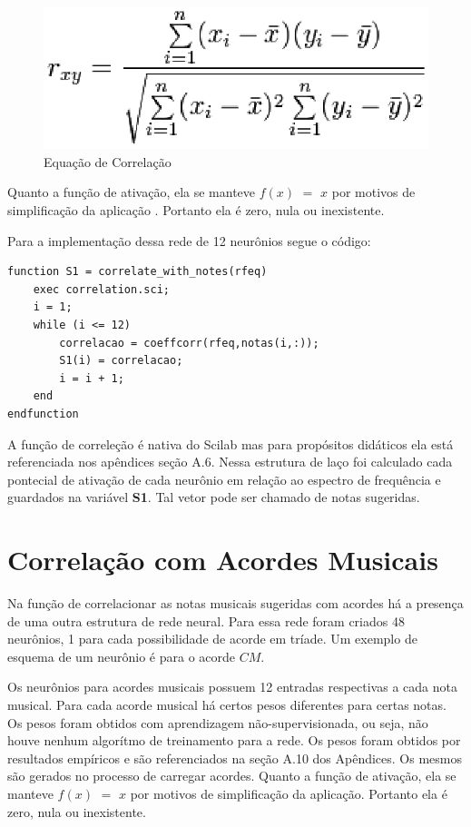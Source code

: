 \begin{figure}[h]
	\centering
		\includegraphics[keepaspectratio=true,scale=0.7]{figuras/correlation-formula}
	\caption{Equação de Correlação}
\end{figure}

Quanto a função de ativação, ela se manteve $f(x)$ $=$ $x$ por motivos de simplificação da aplicação
. Portanto ela é zero, nula ou inexistente.

Para a implementação dessa rede de 12 neurônios segue o código:
\begin{lstlisting}
function S1 = correlate_with_notes(rfeq)
	exec correlation.sci;
	i = 1;
	while (i <= 12)
	    correlacao = coeffcorr(rfeq,notas(i,:));
	    S1(i) = correlacao;
	    i = i + 1;
	end
endfunction
\end{lstlisting}

A função de correleção é nativa do Scilab mas para propósitos didáticos ela está referenciada nos apêndices seção A.6. Nessa estrutura de laço foi calculado cada pontecial de ativação de cada neurônio em relação ao espectro de frequência e guardados na variável \textbf{S1}. Tal vetor pode ser chamado de notas sugeridas.

\section{Correlação com Acordes Musicais}
\label{sec:correlacaoacordes}

Na função de correlacionar as notas musicais sugeridas com acordes há a presença de uma outra estrutura de rede neural. Para essa rede foram criados 48 neurônios, 1 para cada possibilidade de acorde em tríade. Um exemplo de esquema de um neurônio é para o acorde $CM$.

Os neurônios para acordes musicais possuem 12 entradas respectivas a cada nota musical. Para cada acorde musical há certos pesos diferentes para certas notas. Os pesos foram obtidos com aprendizagem não-supervisionada, ou seja, não houve nenhum algorítmo de treinamento para a rede. Os pesos foram obtidos por resultados empíricos e são referenciados na seção A.10 dos Apêndices. Os mesmos são gerados no processo de carregar acordes. Quanto a função de ativação, ela se manteve $f(x)$ $=$ $x$ por motivos de simplificação da aplicação. Portanto ela é zero, nula ou inexistente.

